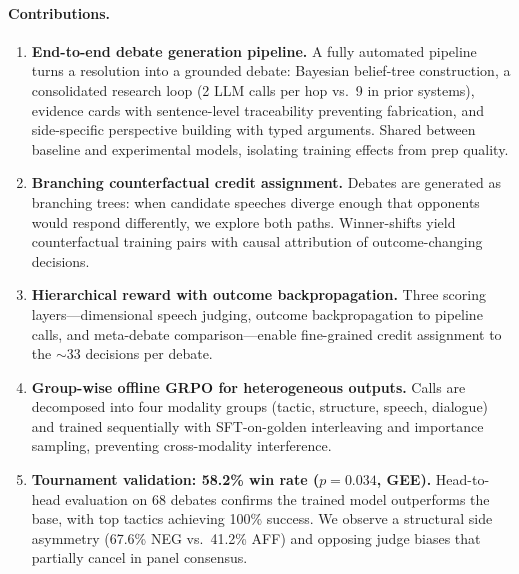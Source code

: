 \paragraph{Contributions.}
\begin{enumerate}
    \item \textbf{End-to-end debate generation pipeline.} A fully
    automated pipeline turns a resolution into a grounded debate: Bayesian
    belief-tree construction, a consolidated research loop (2 LLM calls
    per hop vs.\ 9 in prior systems), evidence cards with sentence-level
    traceability preventing fabrication, and side-specific perspective
    building with typed arguments. Shared between baseline and experimental
    models, isolating training effects from prep quality.

    \item \textbf{Branching counterfactual credit assignment.}
    Debates are generated as branching trees: when candidate speeches
    diverge enough that opponents would respond differently, we explore
    both paths. Winner-shifts yield counterfactual training pairs with
    causal attribution of outcome-changing decisions.

    \item \textbf{Hierarchical reward with outcome backpropagation.}
    Three scoring layers---dimensional speech judging, outcome
    backpropagation to pipeline calls, and meta-debate comparison---enable
    fine-grained credit assignment to the ${\sim}33$ decisions per debate.

    \item \textbf{Group-wise offline GRPO for heterogeneous outputs.}
    Calls are decomposed into four modality groups (tactic, structure,
    speech, dialogue) and trained sequentially with SFT-on-golden
    interleaving and importance sampling, preventing cross-modality
    interference.

    \item \textbf{Tournament validation: 58.2\% win rate ($p{=}0.034$, GEE).}
    Head-to-head evaluation on 68 debates confirms the trained model
    outperforms the base, with top tactics achieving 100\% success.
    We observe a structural side asymmetry (67.6\% NEG vs.\ 41.2\% AFF)
    and opposing judge biases that partially cancel in panel consensus.
\end{enumerate}
